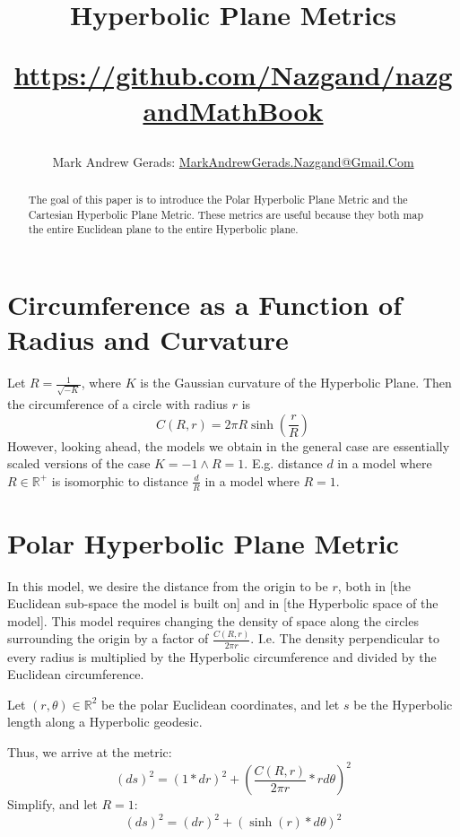 \documentclass[]{article}
\author{Mark Andrew Gerads: \href{MailTo:MarkAndrewGerads.Nazgand@Gmail.Com}{MarkAndrewGerads.Nazgand@Gmail.Com}}
\title{
	Hyperbolic Plane Metrics
	
	\href{https://github.com/Nazgand/nazgandMathBook}{https://github.com/Nazgand/nazgandMathBook}
}
\newcommand{\pqty}[1]{{\left(#1\right)}}
\numberwithin{equation}{section}
\begin{document}
	
	\maketitle
	
	\begin{abstract}
		The goal of this paper is to introduce the Polar Hyperbolic Plane Metric and the Cartesian Hyperbolic Plane Metric. These metrics are useful because they both map the entire Euclidean plane to the entire Hyperbolic plane.
	\end{abstract}
	
	\section{Circumference as a Function of Radius and Curvature}
	Let $R=\frac{1}{\sqrt{-K}}$, where $K$ is the Gaussian curvature of the Hyperbolic Plane. Then the circumference of a circle with radius $r$ is
	\begin{equation}
	C\pqty{R,r}=2\pi R\sinh\pqty{\frac{r}{R}}
	\end{equation}
	However, looking ahead, the models we obtain in the general case are essentially scaled versions of the case $K=-1\land R=1$. E.g. distance $d$ in a model where $R\in\mathbb{R}^+$ is isomorphic to distance $\frac{d}{R}$ in a model where $R=1$.
	
	\section{Polar Hyperbolic Plane Metric}
	In this model, we desire the distance from the origin to be $r$, both in [the Euclidean sub-space the model is built on] and in [the Hyperbolic space of the model]. This model requires changing the density of space along the circles surrounding the origin by a factor of $\frac{C\pqty{R,r}}{2\pi r}$. I.e. The density perpendicular to every radius is multiplied by the Hyperbolic circumference and divided by the Euclidean circumference. 
	
	Let $(r,\theta)\in\mathbb{R}^2$ be the polar Euclidean coordinates, and let $s$ be the Hyperbolic length along a Hyperbolic geodesic.
	
	Thus, we arrive at the metric:
	\begin{equation}
	\pqty{ds}^2 = \pqty{1*dr}^2 + \pqty{\frac{C\pqty{R,r}}{2\pi r}*r d\theta}^2
	\end{equation}
	Simplify, and let $R=1$:
	\begin{equation}
	\pqty{ds}^2 = \pqty{dr}^2 + \pqty{\sinh\pqty{r}*d\theta}^2
	\end{equation}
	
\end{document}
